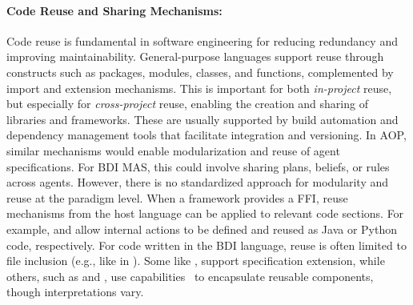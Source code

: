 \paragraph{Code Reuse and Sharing Mechanisms:}

Code reuse is fundamental in software engineering for reducing redundancy and improving maintainability. General-purpose languages support reuse through constructs such as packages, modules, classes, and functions, complemented by import and extension mechanisms.
%
This is important for both \emph{in-project} reuse, but especially for \emph{cross-project} reuse, enabling the creation and sharing of libraries and frameworks. These are usually supported by build automation and dependency management tools that facilitate integration and versioning.
%
In \ac{AOP}, similar mechanisms would enable modularization and reuse of agent specifications. For \ac{BDI} \ac{MAS}, this could involve sharing plans, beliefs, or rules across agents. However, there is no standardized approach for modularity and reuse at the paradigm level.
%
When a framework provides a \ac{FFI}, reuse mechanisms from the host language can be applied to relevant code sections. For example, \jason{} and \spadebdi{} allow internal actions to be defined and reused as Java or Python code, respectively.
%
For code written in the \ac{BDI} language, reuse is often limited to file inclusion (e.g., like in \jason{}). Some like \astra{}, support specification extension, while others, such as \jack{} and \jadex{}, use capabilities~\cite{DBLP:conf/promas/BraubachPL05} to encapsulate reusable components, though interpretations vary.



